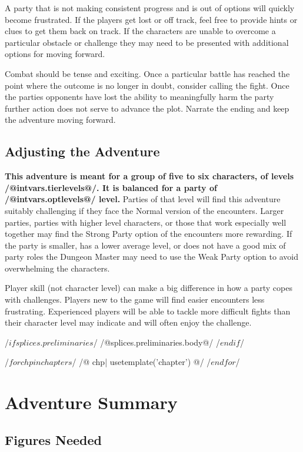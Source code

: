 \documentclass[10pt,twocolumn,twoside,openany]{book}
\begin{document}
A party that is not making consistent progress and is out of options will quickly become frustrated.
If the players get lost or off track, feel free to provide hints or clues to get them back
on track. If the characters are unable to overcome a particular obstacle or challenge they may
need to be presented with additional options for moving forward.

Combat should be tense and exciting. Once a particular battle has reached the point where the
outcome is no longer in doubt, consider calling the fight. Once the parties opponents have lost the
ability to meaningfully harm the party further action does not serve to advance the plot. Narrate the
ending and keep the adventure moving forward.
\vfill
\pagebreak
\section*{Adjusting the Adventure}

\textbf{This adventure is meant for a group of five to six characters, of levels /@intvars.tierlevels@/. It is 
balanced for a party of /@intvars.optlevels@/ level.} Parties of that level will find this 
adventure suitably challenging if they face the Normal version of the encounters. Larger parties,
parties with higher level characters, or
those that work especially well together may find the Strong Party option of the encounters more rewarding.
If the party is smaller, has a lower average level, or does not have a good mix of party roles the
Dungeon Master may need to use the Weak Party option to avoid overwhelming the characters.

Player skill (not character level) can make a big difference in how a party copes with challenges. Players
new to the game will find easier encounters less frustrating. Experienced players will be able to tackle
more difficult fights than their character level may indicate and will often enjoy the challenge.

/$ if splices.preliminaries $/
/@splices.preliminaries.body@/
/$ endif $/

/$ for chp in chapters $/
/@ chp| usetemplate('chapter') @/
/$ endfor $/

\appendix
\chapter{Adventure Summary}
\label{appendix_adventure_summary}

\section*{Figures Needed}
\end{document}

